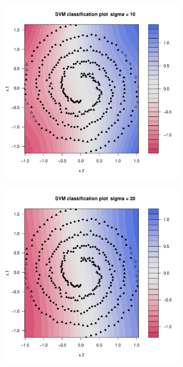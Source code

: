 \begin{figure}[H]
\begin{subfigure}{0.24\linewidth}
		\caption{}
	\end{subfigure}
	\begin{subfigure}{0.24\linewidth}
		\includegraphics[width=1\linewidth]{Graphics/Problema_01/Experiment_04_3.pdf}
		\caption{}
	\end{subfigure}
	\begin{subfigure}{0.24\linewidth}
		\includegraphics[width=1\linewidth]{Graphics/Problema_01/Experiment_04_4.pdf}
		\caption{}
	\end{subfigure}
	\caption{}
\end{figure}